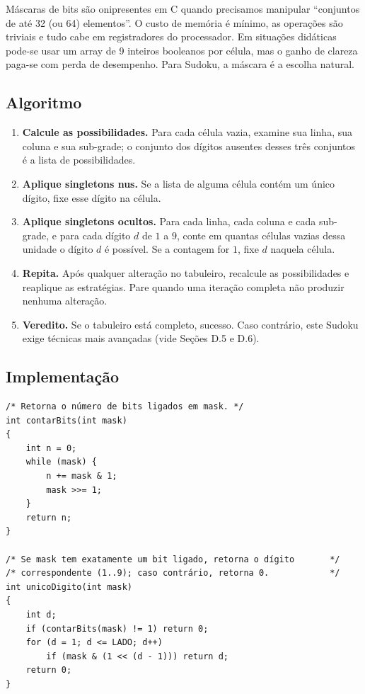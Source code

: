 \documentclass[11pt,a4paper,oneside]{report}
\begin{document}
\begin{engenharia}
Máscaras de bits são onipresentes em C quando precisamos manipular
``conjuntos de até 32 (ou 64) elementos''. O custo de memória é mínimo,
as operações são triviais e tudo cabe em registradores do processador.
Em situações didáticas pode-se usar um array de 9 inteiros booleanos por
célula, mas o ganho de clareza paga-se com perda de desempenho. Para
Sudoku, a máscara é a escolha natural.
\end{engenharia}

\subsection{Algoritmo}

\begin{enumerate}
    \item \textbf{Calcule as possibilidades.} Para cada célula vazia,
        examine sua linha, sua coluna e sua sub-grade; o conjunto dos
        dígitos ausentes desses três conjuntos é a lista de possibilidades.
    \item \textbf{Aplique singletons nus.} Se a lista de alguma célula
        contém um único dígito, fixe esse dígito na célula.
    \item \textbf{Aplique singletons ocultos.} Para cada linha, cada coluna
        e cada sub-grade, e para cada dígito $d$ de $1$ a $9$, conte em
        quantas células vazias dessa unidade o dígito $d$ é possível.
        Se a contagem for $1$, fixe $d$ naquela célula.
    \item \textbf{Repita.} Após qualquer alteração no tabuleiro, recalcule
        as possibilidades e reaplique as estratégias. Pare quando uma
        iteração completa não produzir nenhuma alteração.
    \item \textbf{Veredito.} Se o tabuleiro está completo, sucesso. Caso
        contrário, este Sudoku exige técnicas mais avançadas (vide
        Seções D.5 e D.6).
\end{enumerate}

\subsection{Implementação}

\begin{lstlisting}[caption={Funções auxiliares para manipulação de bitmasks.},label={lst:bitmask}]
/* Retorna o número de bits ligados em mask. */
int contarBits(int mask)
{
    int n = 0;
    while (mask) {
        n += mask & 1;
        mask >>= 1;
    }
    return n;
}

/* Se mask tem exatamente um bit ligado, retorna o dígito       */
/* correspondente (1..9); caso contrário, retorna 0.            */
int unicoDigito(int mask)
{
    int d;
    if (contarBits(mask) != 1) return 0;
    for (d = 1; d <= LADO; d++)
        if (mask & (1 << (d - 1))) return d;
    return 0;
}
\end{lstlisting}
\end{document}
